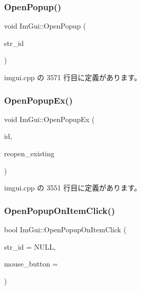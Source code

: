 \subsubsection{\texorpdfstring{Open\+Popup()}{OpenPopup()}}
{\footnotesize\ttfamily void Im\+Gui\+::\+Open\+Popup (\begin{DoxyParamCaption}\item[{const char $\ast$}]{str\+\_\+id }\end{DoxyParamCaption})}



 imgui.\+cpp の 3571 行目に定義があります。

\mbox{\label{namespace_im_gui_a92683a696319581577334d6b798e2f97}} 
\subsubsection{\texorpdfstring{Open\+Popup\+Ex()}{OpenPopupEx()}}
{\footnotesize\ttfamily void Im\+Gui\+::\+Open\+Popup\+Ex (\begin{DoxyParamCaption}\item[{\mbox{\hyperlink{imgui_8h_a1785c9b6f4e16406764a85f32582236f}{Im\+Gui\+ID}}}]{id,  }\item[{bool}]{reopen\+\_\+existing }\end{DoxyParamCaption})}



 imgui.\+cpp の 3551 行目に定義があります。

\mbox{\label{namespace_im_gui_a546fc46d8f510cb17a2f272891e2f5b3}} 
\subsubsection{\texorpdfstring{Open\+Popup\+On\+Item\+Click()}{OpenPopupOnItemClick()}}
{\footnotesize\ttfamily bool Im\+Gui\+::\+Open\+Popup\+On\+Item\+Click (\begin{DoxyParamCaption}\item[{const char $\ast$}]{str\+\_\+id = {\ttfamily NULL},  }\item[{int}]{mouse\+\_\+button = {} }\end{DoxyParamCaption})}



